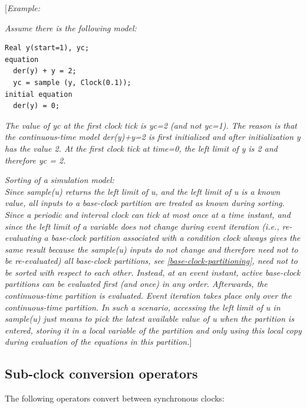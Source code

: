 \documentclass[10pt,a4paper]{report}
\def\doublelabel#1{\label{#1}\hypertarget{#1}{}}
\begin{document}
{[}\emph{Example: }

\emph{Assume there is the following model:}

\begin{lstlisting}[language=modelica]
  Real y(start=1), yc;
equation
  der(y) + y = 2;
  yc = sample (y, Clock(0.1));
initial equation
  der(y) = 0;
\end{lstlisting}
\emph{The value of yc at the first clock tick is yc=2 (and not yc=1).
The reason is that the continuous-time model der(y)+y=2 is first
initialized and after initialization y has the value 2. At the first
clock tick at time=0, the left limit of y is 2 and therefore yc = 2.}

\emph{Sorting of a simulation model:\\
Since sample(u) returns the left limit of u, and the left limit of u is
a known value, all inputs to a base-clock partition are treated as known
during sorting. Since a periodic and interval clock can tick at most
once at a time instant, and since the left limit of a variable does not
change during event iteration (i.e., re-evaluating a base-clock
partition associated with a condition clock always gives the same result
because the sample(u) inputs do not change and therefore need not to be
re-evaluated) all base-clock partitions, see \ref{base-clock-partitioning}, need
not to be sorted with respect to each other. Instead, at an event
instant, active base-clock partitions can be evaluated first (and once)
in any order. Afterwards, the continuous-time partition is evaluated.
Event iteration takes place only over the continuous-time partition. In
such a scenario, accessing the left limit of u in sample(u) just means
to pick the latest available value of u when the partition is entered,
storing it in a local variable of the partition and only using this
local copy during evaluation of the equations in this partition.}{]}

\subsection{Sub-clock conversion operators}\doublelabel{sub-clock-conversion-operators}

The following operators convert between synchronous clocks:
\end{document}
